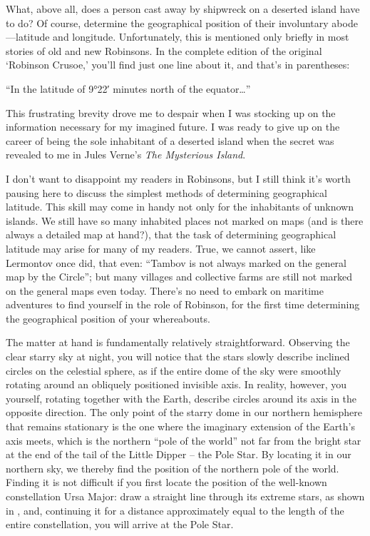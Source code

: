 What, above all, does a person cast away by shipwreck on a deserted island have to do? Of course, determine the geographical position of their involuntary abode—latitude and longitude. Unfortunately, this is mentioned only briefly in most stories of old and new Robinsons. In the complete edition of the original `Robinson Crusoe,' you'll find just one line about it, and that's in parentheses:

``In the latitude of \ang{9;22} minutes north of the equator\dots{}''

This frustrating brevity drove me to despair when I was stocking up on the information necessary for my imagined future. I was ready to give up on the career of being the sole inhabitant of a deserted island when the secret was revealed to me in Jules Verne's \emph{The Mysterious Island}.

I don't want to disappoint my readers in Robinsons, but I still think it's worth pausing here to discuss the simplest methods of determining geographical latitude. This skill may come in handy not only for the inhabitants of unknown islands. We still have so many inhabited places not marked on maps (and is there always a detailed map at hand?), that the task of determining geographical latitude may arise for many of my readers. True, we cannot assert, like Lermontov once did, that even: ``Tambov is not always marked on the general map by the Circle''; but many villages and collective farms are still not marked on the general maps even today. There's no need to embark on maritime adventures to find yourself in the role of Robinson, for the first time determining the geographical position of your whereabouts.


The matter at hand is fundamentally relatively straightforward. Observing the clear starry sky at night, you will notice that the stars slowly describe inclined circles on the celestial sphere, as if the entire dome of the sky were smoothly rotating around an obliquely positioned invisible axis. In reality, however, you yourself, rotating together with the Earth, describe circles around its axis in the opposite direction. The only point of the starry dome in our northern hemisphere that remains stationary is the one where the imaginary extension of the Earth's axis meets, which is the northern ``pole of the world'' not far from the bright star at the end of the tail of the Little Dipper -- the Pole Star. By locating it in our northern sky, we thereby find the position of the northern pole of the world. Finding it is not difficult if you first locate the position of the well-known constellation Ursa Major: draw a straight line through its extreme stars, as shown in , and, continuing it for a distance approximately equal to the length of the entire constellation, you will arrive at the Pole Star.



